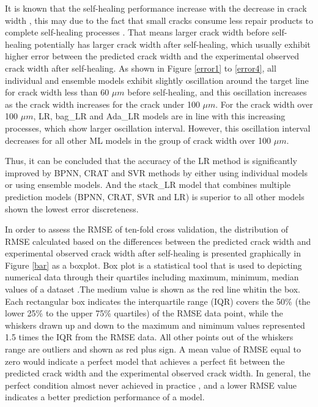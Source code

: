 \documentclass[11pt]{article}
\begin{document}
    
    It is known that the self-healing performance increase with the decrease in crack width \cite{herbert2013selfhealing,liu2017influence}, this may due to the fact that small cracks consume less repair products to complete self-healing processes \cite{de2018review}. That means larger crack width before self-healing potentially has larger crack width after self-healing, which usually exhibit higher error between the predicted crack width and the experimental observed crack width after self-healing. As shown in Figure \ref{error1} to \ref{error4}, all individual and ensemble models exhibit slightly oscillation around the target line for crack width less than 60 $\mu m$ before self-healing, and this oscillation increases as the crack width increases for the crack under 100 $\mu m$. For the crack width over 100 $\mu m$, LR, bag\_LR and Ada\_LR models are in line with this increasing processes, which show larger oscillation interval. However, this oscillation interval decreases for all other ML models in the group of crack width over 100 $\mu m$. 
    
    Thus, it can be concluded that the accuracy of the LR method is significantly improved by BPNN, CRAT and SVR methods by either using individual models or using ensemble models. And the stack\_LR model that combines multiple prediction models (BPNN, CRAT, SVR and LR) is superior to all other models shown the lowest error discreteness. 
	
	
	
	In order to assess the RMSE of ten-fold cross validation, the distribution of RMSE calculated based on the differences between the predicted crack width and experimental observed crack width after self-healing is presented graphically in Figure \ref{bar} as a boxplot. Box plot is a statistical tool that is used to 
	depicting numerical data through their quartiles including maximum, minimum, median values of a dataset \cite{taffese2015caprm,olalusi2020machine}.The medium value is shown as the red line whitin the box. Each rectangular box indicates the interquartile range (IQR) covers the 50\% (the lower 25\% to the upper 75\% quartiles) of the RMSE data point, while the whiskers drawn up and down to the maximum and nimimum values represented 1.5 times the IQR from the RMSE data. All other points out of the whiskers range are outliers and shown as red plus sign. A mean value of RMSE equal to zero would indicate a perfect model that achieves a perfect fit between the predicted crack width and the experimental observed crack width. In general, the perfect condition almost never achieved in practice \cite{wikiRMSE}, and a lower RMSE value indicates a better prediction performance of a model. 
   	
\end{document}
